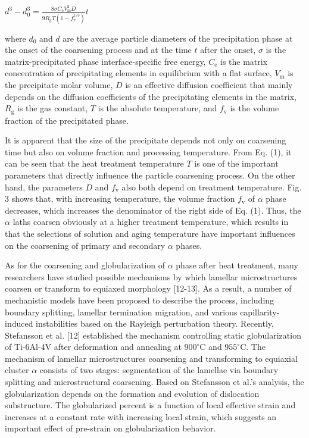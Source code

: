\documentclass[10pt]{article}
\begin{document}
$d^{3}-d_{0}^{3}=\frac{8 \sigma C_{\mathrm{e}} V_{\mathrm{m}}^{2} D}{9 R_{\mathrm{g}} T\left(1-f_{\mathrm{v}}^{1 / 3}\right)} t$

where $d_{0}$ and $d$ are the average particle diameters of the precipitation phase at the onset of the coarsening process and at the time $t$ after the onset, $\sigma$ is the matrix-precipitated phase interface-specific free energy, $C_{\mathrm{e}}$ is the matrix concentration of precipitating elements in equilibrium with a flat surface, $V_{\mathrm{m}}$ is the precipitate molar volume, $D$ is an effective diffusion coefficient that mainly depends on the diffusion coefficients of the precipitating elements in the matrix, $R_{\mathrm{g}}$ is the gas constant, $T$ is the absolute temperature, and $f_{\mathrm{v}}$ is the volume fraction of the precipitated phase.

It is apparent that the size of the precipitate depends not only on coarsening time but also on volume fraction and processing temperature. From Eq. (1), it can be seen that the heat treatment temperature $T$ is one of the important parameters that directly influence the particle coarsening process. On the other hand, the parameters $D$ and $f_{\mathrm{v}}$ also both depend on treatment temperature. Fig. 3 shows that, with increasing temperature, the volume fraction $f_{\mathrm{v}}$ of $\alpha$ phase decreases, which increases the denominator of the right side of Eq. (1). Thus, the $\alpha$ laths coarsen obviously at a higher treatment temperature, which results in that the selections of solution and aging temperature have important influences on the coarsening of primary and secondary $\alpha$ phases.

As for the coarsening and globularization of $\alpha$ phase after heat treatment, many researchers have studied possible mechanisms by which lamellar microstructures coarsen or transform to equiaxed morphology [12-13]. As a result, a number of mechanistic models have been proposed to describe the process, including boundary splitting, lamellar termination migration, and various capillarity-induced instabilities based on the Rayleigh perturbation theory. Recently, Stefansson et al. [12] established the mechanism controlling static globularization of Ti-6Al-4V after deformation and annealing at $900^{\circ} \mathrm{C}$ and $955^{\circ} \mathrm{C}$. The mechanism of lamellar microstructures coarsening and transforming to equiaxial cluster $\alpha$ consists of two stages: segmentation of the lamellae via boundary splitting and microstructural coarsening. Based on Stefansson et al.'s analysis, the globularization depends on the formation and evolution of dislocation substructure. The globularized percent is a function of local effective strain and increases at a constant rate with increasing local strain, which suggests an important effect of pre-strain on globularization behavior.
\end{document}
